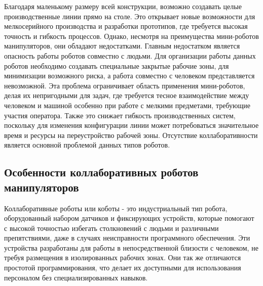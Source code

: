 Благодаря маленькому размеру всей конструкции, возможно создавать целые производственные линии прямо на столе. Это открывает новые возможности для мелкосерийного производства и разработки прототипов, где требуется высокая точность и гибкость процессов. Однако, несмотря на преимущества мини-роботов манипуляторов, они обладают недостатками. Главным недостатком является опасность работы роботов совместно с людьми. Для организации работы данных роботов необходимо создавать специальные закрытые рабочие зоны, для минимизации возможного риска, а работа совместно с человеком представляется невозможной.
Эта проблема ограничивает область применения мини-роботов, делая их непригодными для задач, где требуется тесное взаимодействие между человеком и машиной особенно при работе с мелкими предметами, требующие участия оператора. Также это снижает гибкость производственных систем, поскольку для изменения конфигурации линии может потребоваться значительное время и ресурсы на переустройство рабочей зоны. Отсутствие коллаборативности является основной проблемой данных типов роботов.


\subsection{Особенности коллаборативных роботов манипуляторов}

Коллаборативные роботы или коботы - это индустриальный тип робота, оборудованный набором датчиков и фиксирующих устройств, которые помогают с высокой точностью избегать столкновений с людьми и различными препятствиями, даже в случаях неисправности программного обеспечения. Эти устройства разработаны для работы в непосредственной близости с человеком, не требуя размещения в изолированных рабочих зонах. Они так же отличаются простотой программирования, что делает их доступными для использования персоналом без специализированных навыков.

